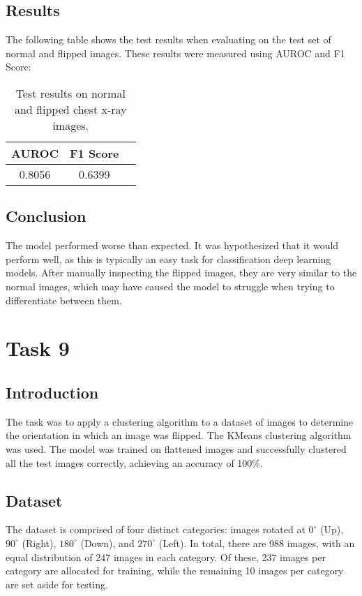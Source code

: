 \documentclass[10pt,twocolumn,letterpaper]{article}
\begin{document}
\subsection{Results}
The following table shows the test results when evaluating on the test set of normal and flipped images. These results were measured using AUROC and F1 Score:

\begin{table}[h!]
\centering
\begin{tabular}{|c|c|c|}
\hline
 \textbf{AUROC} & \textbf{F1 Score} \\
\hline
 0.8056 & 0.6399 \\

\hline
\end{tabular}
\caption{Test results on normal and flipped chest x-ray images.}
\end{table}
\subsection{Conclusion}
The model performed worse than expected. It was hypothesized that it would perform well, as this is typically an easy task for classification deep learning models. After manually inspecting the flipped images, they are very similar to the normal images, which may have caused the model to struggle when trying to differentiate between them.

\section{Task 9}

\subsection{Introduction}
The task was to apply a clustering algorithm to a dataset of images to determine the orientation in which an image was flipped. The KMeans clustering algorithm was used. The model was trained on flattened images and successfully clustered all the test images correctly, achieving an accuracy of 100\%.

\subsection{Dataset}
The dataset is comprised of four distinct categories: images rotated at $0^{\circ}$ (Up), $90^{\circ}$ (Right), $180^{\circ}$ (Down), and $270^{\circ}$ (Left). In total, there are 988 images, with an equal distribution of 247 images in each category. Of these, 237 images per category are allocated for training, while the remaining 10 images per category are set aside for testing.
\end{document}
